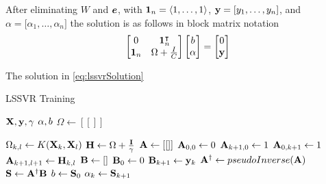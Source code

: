 After eliminating $W$ and $\vb*{e}$, with $\vb{1}_{n} = \langle 1,\dots,1\rangle$, $\vb{y} = \lbrack y_1, \dots, y_n \rbrack $, and ${\alpha} = \lbrack \alpha_1, \dots, \alpha_n \rbrack $ the solution is as follows in block matrix notation
\begin{equation} \label{eq:lssvrSolution}
        \begin{bmatrix}
                0          & \vb{1}_{n}^{\intercal} \\
                \vb{1}_{n} & \Omega + \frac{I}{C}
        \end{bmatrix}
        \begin{bmatrix}
                b           \\
                \vb{\alpha} \\
        \end{bmatrix}
        =
        \begin{bmatrix}
                0      \\
                \vb{y} \\
        \end{bmatrix}
\end{equation}

The solution in \cref{eq:lssvrSolution}

\begin{algorithm}[H]
        \caption{LSSVR Training}\label{alg1:cap}
        \begin{algorithmic}[1]
                \Require $\vb{X}, \vb{y}, \gamma$
                \Ensure $\vb{\alpha}, b$
                \State $\Omega \gets [[]]$ 

                \State$\Omega_{k,l}\gets K(\vb{X}_k,\vb{X}_l)$
                \EndFor
                \EndFor
                \State $\vb{H} \gets \Omega + \frac{\vb{I}}{\gamma}$
                \State $\vb{A} \gets [[]]$ 
                \State $\vb{A}_{0,0} \gets 0$
                \State $\vb{A}_{k+1,0} \gets 1$
                \State $\vb{A}_{0,k+1} \gets 1$
                \EndFor
                \State $\vb{A}_{k+1,l+1} \gets \vb{H}_{k,l}$
                \EndFor
                \EndFor
                \State $\vb{B}\gets []$ 
                \State $\vb{B}_0 \gets 0$
                \State $\vb{B}_{k+1} \gets \vb{y}_{k}$
                \EndFor
                \State $\vb{A}^{\dagger} \gets pseudoInverse(\vb{A})$ 
                \State $\vb{S} \gets \vb{A}^{\dagger}\vb{B}$
                \State $b \gets \vb{S}_{0}$
                \State $\vb{\alpha}_{k} \gets \vb{S}_{k+1}$
                \EndFor
        \end{algorithmic}
\end{algorithm}

